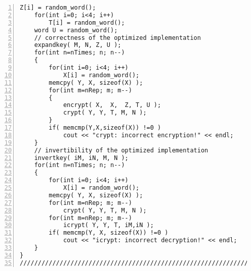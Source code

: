 \documentclass[a4paper,oneside,english]{amsart}
\numberwithin{equation}{section}
\numberwithin{figure}{section}
\begin{document}
\begin{lstlisting}[basicstyle={\scriptsize\ttfamily},numbers=left,tabsize=4]
        Z[i] = random_word();
    for(int i=0; i<4; i++)
        T[i] = random_word();
    word U = random_word();
    // correctness of the optimized implementation
    expandkey( M, N, Z, U );
    for(int n=nTimes; n; n--)
    {
        for(int i=0; i<4; i++)
            X[i] = random_word();
        memcpy( Y, X, sizeof(X) );
        for(int m=nRep; m; m--)
        {
            encrypt( X,  X,  Z, T, U );
            crypt( Y, Y, T, M, N );
        }
        if( memcmp(Y,X,sizeof(X)) !=0 )
            cout << "crypt: incorrect encryption!" << endl;
    }
    // invertibility of the optimized implementation
    invertkey( iM, iN, M, N );
    for(int n=nTimes; n; n--)
    {
        for(int i=0; i<4; i++)
            X[i] = random_word();
        memcpy( Y, X, sizeof(X) );
        for(int m=nRep; m; m--)
            crypt( Y, Y, T, M, N );
        for(int m=nRep; m; m--)
            icrypt( Y, Y, T, iM,iN );
        if( memcmp(Y, X, sizeof(X)) !=0 )
            cout << "icrypt: incorrect decryption!" << endl;
    }
}
////////////////////////////////////////////////////////////////////////
\end{lstlisting}
\end{document}
